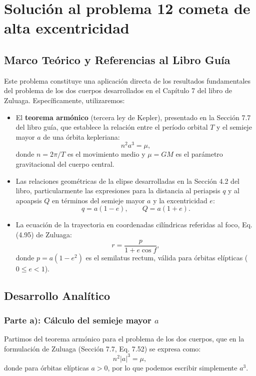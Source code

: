 \documentclass[12pt, a4paper]{article}
\begin{document}
\section*{Solución al problema 12 cometa de alta excentricidad}

\subsection*{Marco Teórico y Referencias al Libro Guía}

Este problema constituye una aplicación directa de los resultados fundamentales del problema de los dos cuerpos desarrollados en el Capítulo 7 del libro de Zuluaga. Específicamente, utilizaremos:

\begin{itemize}
    \item El \textbf{teorema armónico} (tercera ley de Kepler), presentado en la Sección 7.7 del libro guía, que establece la relación entre el período orbital $T$ y el semieje mayor $a$ de una órbita kepleriana:
    $$n^2 a^3 = \mu,$$
    donde $n = 2\pi/T$ es el movimiento medio y $\mu = GM$ es el parámetro gravitacional del cuerpo central.
    
    \item Las relaciones geométricas de la elipse desarrolladas en la Sección 4.2 del libro, particularmente las expresiones para la distancia al periapsis $q$ y al apoapsis $Q$ en términos del semieje mayor $a$ y la excentricidad $e$:
    $$q = a(1-e), \qquad Q = a(1+e).$$
    
    \item La ecuación de la trayectoria en coordenadas cilíndricas referidas al foco, Eq. (4.95) de Zuluaga:
    $$r = \frac{p}{1+e\cos f},$$
    donde $p = a(1-e^2)$ es el semilatus rectum, válida para órbitas elípticas ($0 \leq e < 1$).
\end{itemize}

\subsection*{Desarrollo Analítico}

\subsubsection*{Parte a): Cálculo del semieje mayor $a$}

Partimos del teorema armónico para el problema de los dos cuerpos, que en la formulación de Zuluaga (Sección 7.7, Eq. 7.52) se expresa como:
$$n^2 |a|^3 = \mu,$$
donde para órbitas elípticas $a > 0$, por lo que podemos escribir simplemente $a^3$.
\end{document}
